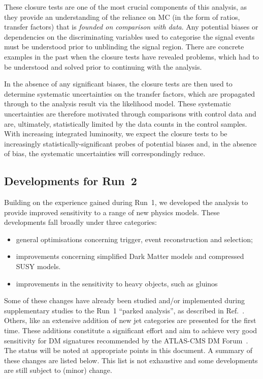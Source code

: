 These closure tests are one of the most crucial components of this
analysis, as they provide an understanding of the reliance on MC (in
the form of ratios, \ie transfer factors) that is {\it founded on
  comparison with data}. Any potential biases or dependencies on the
discriminating variables used to categorise the signal events must be
understood prior to unblinding the signal region. There are concrete
examples in the past when the closure tests have revealed problems,
which had to be understood and solved prior to continuing with the
analysis.

In the absence of any significant biases, the closure tests are then
used to determine systematic uncertainties on the transfer factors,
which are propagated through to the analysis result via the likelihood
model. These systematic uncertainties are therefore motivated through
comparisons with control data and are, ultimately, statistically
limited by the data counts in the control samples. With increasing
integrated luminosity, we expect the closure tests to be increasingly
statistically-significant probes of potential biases and, in the
absence of bias, the systematic uncertainties will correspondingly
reduce.

\subsection{Developments for Run~2}
\label{sec:changes}

Building on the experience gained during Run~1, we developed the
analysis to provide improved sensitivity to a range of new physics
models. These developments fall broadly under three categories:

\begin{itemize}
\item general optimisations concerning trigger, event reconstruction and
  selection;
\item improvements concerning simplified Dark Matter models and compressed SUSY
  models. 
\item improvements in the sensitivity to heavy objects, such as gluinos 
\end{itemize}

Some of these changes have already been studied and/or implemented
during supplementary studies to the Run~1 ``parked analysis'', as
described in Ref.~\cite{Khachatryan:2016pxa}. Others, like an extensive addition of new
jet categories are presented for the first time. These additions constitute a significant effort and aim to achieve very good 
sensitivity for DM signatures recommended by the ATLAS-CMS DM Forum~\cite{Abercrombie:2015wmb}.
The status will be noted at appropriate points in this document. A summary of these changes are
listed below. This list is not exhaustive and some developments are
still subject to (minor) change.

